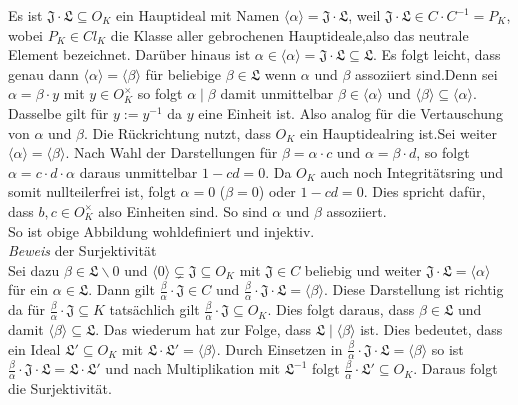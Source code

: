 \documentclass[10pt,a4paper]{article}
\begin{document}
Es ist $\mathfrak{J\cdot L}\subseteq O_K$ ein Hauptideal mit Namen $\langle \alpha \rangle=\mathfrak{J\cdot L}$, weil $\mathfrak{J\cdot L} \in C\cdot C^{-1} = P_K$, wobei $P_K \in Cl_K$ die Klasse aller gebrochenen Hauptideale,also das neutrale Element bezeichnet. Darüber hinaus ist $\alpha \in \langle \alpha \rangle=\mathfrak{J\cdot L}\subseteq \mathfrak{L}$. Es folgt leicht, dass genau dann $\langle \alpha \rangle=\langle \beta \rangle$ für beliebige $\beta \in \mathfrak{L}$ wenn $\alpha$ und $\beta$ assoziiert sind.Denn sei $\alpha=\beta \cdot y$ mit $y \in O_K^{\times}$ so folgt $\alpha \mid \beta$ damit unmittelbar $\beta \in \langle \alpha \rangle$ und $\langle \beta \rangle  \subseteq \langle \alpha \rangle$. Dasselbe gilt für $y:= y^{-1}$ da $y$ eine Einheit ist. Also analog für die Vertauschung von $\alpha$ und $\beta$. Die Rückrichtung nutzt, dass $O_K$ ein Hauptidealring ist.Sei weiter $\langle \alpha \rangle=\langle \beta \rangle$. Nach Wahl der Darstellungen für $\beta=\alpha\cdot c$ und $\alpha=\beta\cdot d$, so folgt $\alpha=c\cdot d \cdot \alpha$ daraus unmittelbar $1-cd=0$. Da $O_K$ auch noch Integritätsring und somit nullteilerfrei ist, folgt $\alpha=0$  ($\beta =0$) oder $1-cd=0$. Dies spricht dafür, dass $b,c \in O_K^{\times}$ also Einheiten sind. So sind $\alpha$ und $\beta$ assoziiert.
\\
So ist obige Abbildung wohldefiniert und injektiv.
\\
\textit{Beweis} der Surjektivität
\\
Sei dazu $\beta \in \mathfrak{L}\backslash{0}$ und  $\langle 0 \rangle \subsetneq \mathfrak{J} \subseteq O_K$ mit $\mathfrak{J} \in C$ beliebig und weiter $\mathfrak{J\cdot L}= \langle \alpha \rangle$ für ein $\alpha \in \mathfrak{L}$. Dann gilt $\frac{\beta}{\alpha} \cdot \mathfrak{J} \in C$ und $\frac{\beta}{\alpha} \cdot \mathfrak{J\cdot L} = \langle \beta\rangle$. Diese Darstellung ist richtig da für $\frac{\beta}{\alpha} \cdot \mathfrak{J} \subseteq K$ tatsächlich gilt $\frac{\beta}{\alpha} \cdot \mathfrak{J} \subseteq O_K$. Dies folgt daraus, dass $\beta \in \mathfrak{L}$ und damit $\langle \beta \rangle \subseteq \mathfrak{L}$. Das wiederum hat zur Folge, dass $\mathfrak{L}\mid \langle \beta \rangle$ ist. Dies bedeutet, dass ein Ideal $\mathfrak{L'}\subseteq O_K$ mit $\mathfrak{L\cdot L'}= \langle \beta \rangle$. Durch Einsetzen in $\frac{\beta}{\alpha} \cdot \mathfrak{J\cdot L} = \langle \beta\rangle$ so ist $\frac{\beta}{\alpha} \cdot \mathfrak{J\cdot L} = \mathfrak{L \cdot L'} $ und nach Multiplikation mit $\mathfrak{L^{-1}}$ folgt $\frac{\beta}{\alpha} \cdot \mathfrak{L'}\subseteq O_K$. Daraus folgt die Surjektivität.
\end{document}
